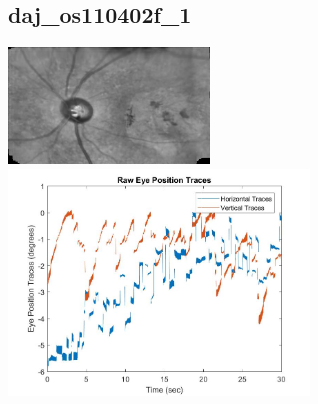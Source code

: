 \documentclass[11pt]{article}
\begin{document}
\subsection{daj\_os110402f\_1}
\includegraphics[width=0.40\textwidth, valign=m]{referenceframes/rodenstock_amd/daj_os110402f_1_dwt_nostim_gamscaled_bandfilt_refframe.jpg}
\includegraphics[width=0.60\textwidth, valign=m]{eyepositiontraces/rodenstock_amd/daj_os110402f_1.jpg}\\
\end{document}

